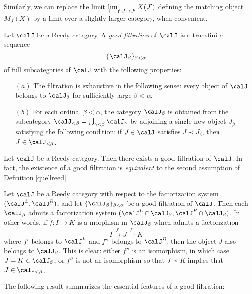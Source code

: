 \begin{Model Categories}
\begin{Didn't Read}
\begin{remark}
Similarly, we can replace the limit $\varprojlim_{ f: J \rightarrow J'} X(J')$
defining the matching object $M_{J}(X)$ by a limit over a slightly larger category, when convenient.
\end{remark}

\begin{notation}
Let $\calJ$ be a Reedy category. A {\it good filtration} of $\calJ$ is a transfinite sequence
$$ \{ \calJ_{\beta} \}_{\beta < \alpha}$$ of full subcategories of $\calJ$ with the following properties:
\begin{itemize}
\item[$(a)$] The filtration is exhaustive in the following sense: every object of
$\calJ$ belongs to $\calJ_{\beta}$ for sufficiently large $\beta < \alpha$.
\item[$(b)$] For each ordinal $\beta < \alpha$, the category $\calJ_{\beta}$ is obtained
from the subcategory $\calJ_{< \beta} = \bigcup_{ \gamma < \beta} \calJ_{\gamma}$
by adjoining a single new object $J_{\beta}$ satisfying the following condition:
if $J \in \calJ$ satisfies $J \prec J_{\beta}$, then $J \in \calJ_{< \beta}$.
\end{itemize}
\end{notation}

\begin{remark}
Let $\calJ$ be a Reedy category. Then there exists a good filtration of $\calJ$. In fact, the
existence of a good filtration is {\em equivalent} to the second assumption of Definition \ref{quellreed}.  
\end{remark}

\begin{remark}
Let $\calJ$ be a Reedy category with respect to the factorization system
$(\calJ^{L}, \calJ^{R})$, and let $\{ \calJ_{\beta} \}_{\beta < \alpha}$ be a good filtration of $\calJ$. Then each $\calJ_{\beta}$ admits a factorization system
$( \calJ^{L} \cap \calJ_{\beta}, \calJ^{R} \cap \calJ_{\beta})$. In other words, if
$f: I \rightarrow K$ is a morphism in $\calJ_{\beta}$ which admits a factorization
$$ I \stackrel{f'}{\rightarrow} J \stackrel{f''}{\rightarrow} K$$
where $f'$ belongs to $\calJ^{L}$ and $f''$ belongs to $\calJ^{R}$, then
the object $J$ also belongs to $\calJ_{\beta}$. This is clear: either
$f''$ is an isomorphism, in which case $J = K \in \calJ_{\beta}$, or
$f''$ is not an isomorphism so that $J \prec K$ implies that $J \in \calJ_{< \beta}$.
\end{remark}

The following result summarizes the essential features of a good filtration:


\end{Didn't Read}
\end{Model Categories}
